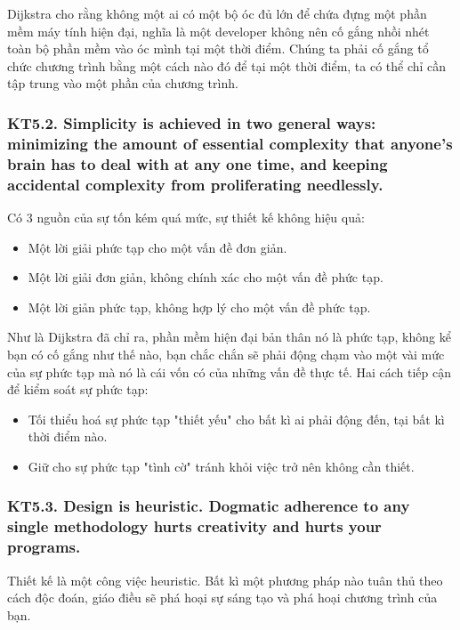 \documentclass[12pt]{report}
\begin{document}
Dijkstra cho rằng không một ai có một bộ óc đủ lớn để chứa đựng một phần mềm máy tính hiện đại, nghĩa là một developer không nên cố gắng nhồi nhét toàn bộ phần mềm vào óc mình tại một thời điểm. Chúng ta phải cố gắng tổ chức chương trình bằng một cách nào đó để tại một thời điểm, ta có thể chỉ cần tập trung vào một phần của chương trình. 


\subsubsection{KT5.2. Simplicity is achieved in two general ways: minimizing the amount of essential complexity that anyone's brain has to deal with at any one time, and keeping accidental complexity from proliferating needlessly.}

Có 3 nguồn của sự tốn kém quá mức, sự thiết kế không hiệu quả:
\begin{itemize}
	\item Một lời giải phức tạp cho một vấn đề đơn giản. 
	\item Một lời giải đơn giản, không chính xác cho một vấn đề phức tạp. 
	\item Một lời giản phức tạp, không hợp lý cho một vấn đề phức tạp. 
\end{itemize}
Như là Dijkstra đã chỉ ra, phần mềm hiện đại bản thân nó là phức tạp, không kể bạn có cố gắng như thế nào, bạn chắc chắn sẽ phải động chạm vào một vài mức của sự phức tạp mà nó là cái vốn có của những vấn đề thực tế. 
Hai cách tiếp cận để kiểm soát sự phức tạp:
\begin{itemize}
	\item Tối thiểu hoá sự phức tạp "thiết yếu" cho bất kì ai phải động đến, tại bất kì thời điểm nào. 
	\item Giữ cho sự phức tạp "tình cờ" tránh khỏi việc trở nên không cần thiết. 
\end{itemize}

\subsubsection{KT5.3. Design is heuristic. Dogmatic adherence to any single methodology hurts creativity and hurts your programs.}
Thiết kế là một công việc heuristic. Bất kì một phương pháp nào tuân thủ theo cách độc đoán, giáo điều sẽ phá hoại sự sáng tạo và phá hoại chương trình của bạn. 
\vspace*{3mm}
\end{document}
